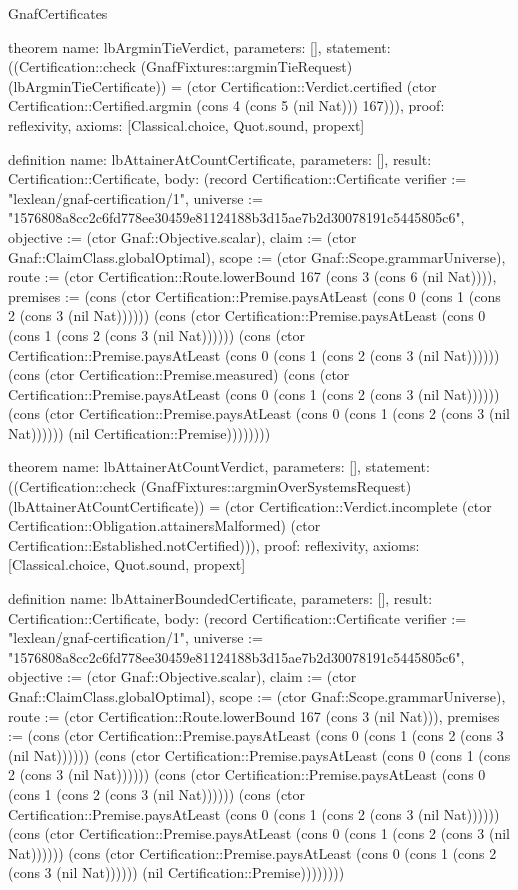 \begin{lexlean}{GnafCertificates}
\begin{semanticmodule}
theorem{
  name: lbArgminTieVerdict,
  parameters: [],
  statement: ((Certification::check (GnafFixtures::argminTieRequest) (lbArgminTieCertificate)) = (ctor Certification::Verdict.certified (ctor Certification::Certified.argmin (cons 4 (cons 5 (nil Nat))) 167))),
  proof: reflexivity{},
  axioms: [Classical.choice, Quot.sound, propext]
}

definition{
  name: lbAttainerAtCountCertificate,
  parameters: [],
  result: Certification::Certificate,
  body: (record Certification::Certificate {verifier := "lexlean/gnaf-certification/1", universe := "1576808a8cc2c6fd778ee30459e81124188b3d15ae7b2d30078191c5445805c6", objective := (ctor Gnaf::Objective.scalar), claim := (ctor Gnaf::ClaimClass.globalOptimal), scope := (ctor Gnaf::Scope.grammarUniverse), route := (ctor Certification::Route.lowerBound 167 (cons 3 (cons 6 (nil Nat)))), premises := (cons (ctor Certification::Premise.paysAtLeast (cons 0 (cons 1 (cons 2 (cons 3 (nil Nat)))))) (cons (ctor Certification::Premise.paysAtLeast (cons 0 (cons 1 (cons 2 (cons 3 (nil Nat)))))) (cons (ctor Certification::Premise.paysAtLeast (cons 0 (cons 1 (cons 2 (cons 3 (nil Nat)))))) (cons (ctor Certification::Premise.measured) (cons (ctor Certification::Premise.paysAtLeast (cons 0 (cons 1 (cons 2 (cons 3 (nil Nat)))))) (cons (ctor Certification::Premise.paysAtLeast (cons 0 (cons 1 (cons 2 (cons 3 (nil Nat)))))) (nil Certification::Premise)))))))})
}

theorem{
  name: lbAttainerAtCountVerdict,
  parameters: [],
  statement: ((Certification::check (GnafFixtures::argminOverSystemsRequest) (lbAttainerAtCountCertificate)) = (ctor Certification::Verdict.incomplete (ctor Certification::Obligation.attainersMalformed) (ctor Certification::Established.notCertified))),
  proof: reflexivity{},
  axioms: [Classical.choice, Quot.sound, propext]
}

definition{
  name: lbAttainerBoundedCertificate,
  parameters: [],
  result: Certification::Certificate,
  body: (record Certification::Certificate {verifier := "lexlean/gnaf-certification/1", universe := "1576808a8cc2c6fd778ee30459e81124188b3d15ae7b2d30078191c5445805c6", objective := (ctor Gnaf::Objective.scalar), claim := (ctor Gnaf::ClaimClass.globalOptimal), scope := (ctor Gnaf::Scope.grammarUniverse), route := (ctor Certification::Route.lowerBound 167 (cons 3 (nil Nat))), premises := (cons (ctor Certification::Premise.paysAtLeast (cons 0 (cons 1 (cons 2 (cons 3 (nil Nat)))))) (cons (ctor Certification::Premise.paysAtLeast (cons 0 (cons 1 (cons 2 (cons 3 (nil Nat)))))) (cons (ctor Certification::Premise.paysAtLeast (cons 0 (cons 1 (cons 2 (cons 3 (nil Nat)))))) (cons (ctor Certification::Premise.paysAtLeast (cons 0 (cons 1 (cons 2 (cons 3 (nil Nat)))))) (cons (ctor Certification::Premise.paysAtLeast (cons 0 (cons 1 (cons 2 (cons 3 (nil Nat)))))) (cons (ctor Certification::Premise.paysAtLeast (cons 0 (cons 1 (cons 2 (cons 3 (nil Nat)))))) (nil Certification::Premise)))))))})
}


\end{semanticmodule}
\end{lexlean}
